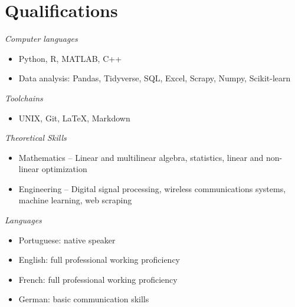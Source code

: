 \section{Qualifications} 

{\sl Computer languages} 
\begin{itemize}
	\item[] Python, R, MATLAB, C++
	\item[] Data analysis: Pandas, Tidyverse, SQL, Excel, Scrapy, Numpy, Scikit-learn
\end{itemize}

{\sl Toolchains}
\begin{itemize}
	\item[] UNIX, Git, \LaTeX, Markdown
\end{itemize}

{\sl Theoretical Skills}
\begin{itemize}
	\item[] Mathematics --  Linear and multilinear algebra, statistics, linear and non-linear optimization
	\item[] Engineering -- Digital signal processing, wireless communications systems, machine learning, web scraping
\end{itemize}

\vspace{0.5cm}

{\sl Languages}
\begin{itemize}
	\item[] Portuguese: native speaker
	\item[] English: full professional working proficiency
	\item[] French: full professional working proficiency
	\item[] German: basic communication skills
\end{itemize}